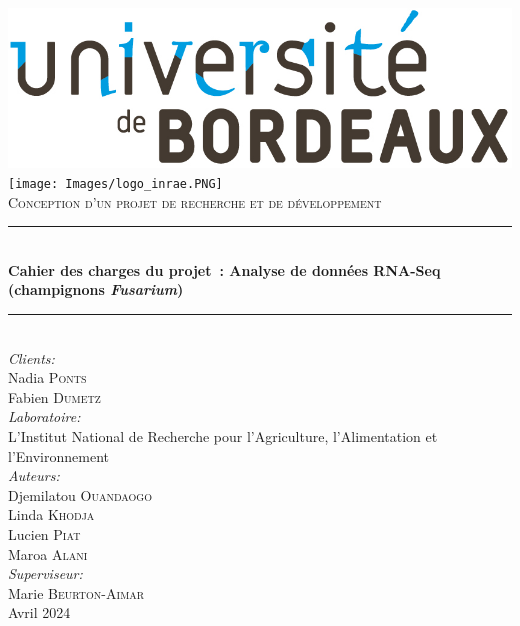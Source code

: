 \documentclass{report}
\begin{document}
\begin{titlepage}

\newcommand{\reportyear}{Avril 2024}
\newcommand{\HRule}{\rule{\linewidth}{0.5mm}} %
\center %
\includegraphics[scale=0.3]{Images/logo_ub.png}\\[0,5cm] %
\texttt{[image: Images/logo\_inrae.PNG]}\\[1cm] %
\textsc{\Large Conception d'un projet de recherche et de développement}\\[0.5cm] %
\HRule \\[0.4cm]
{ \huge \bfseries Cahier des charges du projet : Analyse de données RNA-Seq (champignons \textit{Fusarium})}\\[0.3cm] %
\HRule \\[0,8cm]

\Large \emph{Clients:}\\
Nadia \textsc{Ponts}\\
Fabien \textsc{Dumetz}\\[0,8cm]

\Large \emph{Laboratoire:}\\
L’Institut National de Recherche pour l’Agriculture, l’Alimentation et l’Environnement\\[0,8cm]

\Large \emph{Auteurs:}\\
Djemilatou \textsc{Ouandaogo}\\
Linda \textsc{Khodja}\\
Lucien \textsc{Piat}\\
Maroa \textsc{Alani}\\[0,8cm]

\Large \emph{Superviseur:}\\
 Marie \textsc{Beurton-Aimar}\\[1cm]
\reportyear

\vfill %
\end{titlepage}
\end{document}
